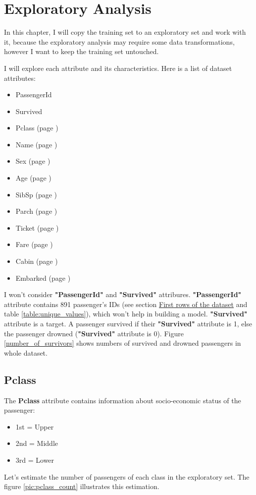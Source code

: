 \chapter{Exploratory Analysis}
In this chapter, I will copy the training  set to an exploratory set and 
work with it, because the exploratory analysis may require some data 
transformations, however I want to keep the training set untouched.

I will explore each attribute and its characteristics. Here is a list of
dataset attributes:
\begin{itemize}
	\item PassengerId
    \item Survived
    \item Pclass (page \pageref{section:Pclass})
    \item Name (page \pageref{section:Name})
    \item Sex (page \pageref{section:Sex})
    \item Age (page \pageref{section:Age})
    \item SibSp (page \pageref{section:SibSp})
    \item Parch (page \pageref{section:Parch})
    \item Ticket (page \pageref{section:Ticket})
    \item Fare (page \pageref{section:Fare})
    \item Cabin (page \pageref{section:Cabin})
    \item Embarked (page \pageref{section:Embarked})
\end{itemize}

I won't consider \textbf{"PassengerId"} and \textbf{"Survived"} attribures.
\textbf{"PassengerId"} attribute contains 891 passenger's IDs (see section 
\hyperref[section:first_rows]{First rows of the dataset} and table 
\ref{table:unique_values}), which won't help in building a model.
\textbf{"Survived"} attribute is a target. A passenger survived if their 
\textbf{"Survived"} attribute is 1, else the passenger drowned 
(\textbf{"Survived"} attribute is 0). Figure \ref{number_of_survivors}
shows numbers of survived and drowned passengers in whole dataset.


\section{Pclass} \label{section:Pclass}
The \textbf{Pclass} attribute contains information about socio-economic
status of the passenger:
\begin{itemize}
    \item 1st = Upper
    \item 2nd = Middle
    \item 3rd = Lower
\end{itemize}
Let's estimate the number of passengers of each class in the exploratory
set. The figure \ref{pic:pclass_count} illustrates this estimation.

